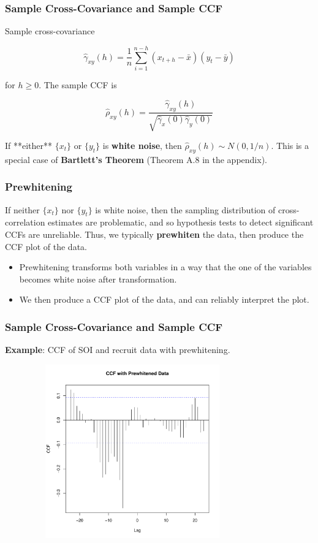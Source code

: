 \documentclass[%
xcolor=pdftex]{beamer}
\begin{document}
\begin{frame}
\frametitle{Sample Cross-Covariance and Sample CCF}

Sample cross-covariance

\begin{equation*}
\hat{\gamma}_{xy}(h) = \frac{1}{n} \sum_{i=1}^{n-h} (x_{t+h} - \bar{x}) (y_{t} - \bar{y})
\end{equation*}

for $h \geq 0$. The sample CCF is

\begin{equation*}
\hat{\rho}_{xy}(h) = \frac{\hat{\gamma}_{xy}(h)}{\sqrt{\hat{\gamma}_{x}(0) \hat{\gamma}_{y}(0) }}
\end{equation*}

If **either** $\{x_t\}$ or $\{y_t\}$ is \textbf{white noise}, then $\hat{\rho}_{xy}(h) \sim N(0, 1/n)$. This is a special case of {\bf Bartlett's Theorem} (Theorem A.8 in the appendix).

\end{frame}

\begin{frame}
\frametitle{Prewhitening}

If neither $\{x_t\}$ nor $\{y_t\}$ is white noise, then the sampling distribution of cross-correlation estimates are problematic, and so hypothesis tests to detect significant CCFs are unreliable. Thus, we typically \textbf{prewhiten} the data, then produce the CCF plot of the data. 

\begin{itemize}

\item Prewhitening transforms both variables in a way that the one of the variables becomes white noise after transformation. 

\item We then produce a CCF plot of the data, and can reliably interpret the plot. 

\end{itemize}

\end{frame}

\begin{frame}
\frametitle{Sample Cross-Covariance and Sample CCF}

\textbf{Example}: CCF of SOI and recruit data with prewhitening.

\includegraphics[width=110mm, height=75mm]{ccf_soi.pdf}

\end{frame}
\end{document}
